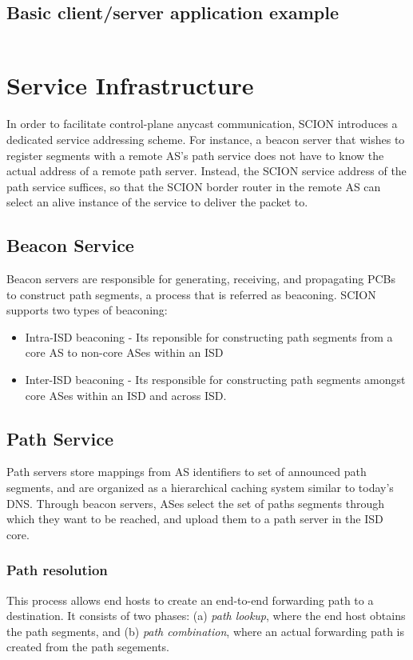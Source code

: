 \subsection{Basic client/server application example}
\inputminted[frame=lines, framesep=2mm, baselinestretch=1.2, fontsize=\footnotesize, linenos]{go}{code_snippets/temp.go}

\section{Service Infrastructure}
In order to facilitate control-plane anycast communication, SCION introduces a dedicated service addressing scheme. For instance, a beacon server that wishes to register segments with a remote AS's path service does not have to know the actual address of a remote path server. Instead, the SCION service address of the path service suffices, so that the SCION border router in the remote AS can select an alive instance of the service to deliver the packet to.

\subsection{Beacon Service}
Beacon servers are responsible for generating, receiving, and propagating PCBs to construct path segments, a process that is referred as beaconing. SCION supports two types of beaconing:
\begin{itemize}
    \item Intra-ISD beaconing - Its reponsible for constructing path segments from a core AS to non-core ASes within an ISD
    \item Inter-ISD beaconing - Its responsible for constructing path segments amongst core ASes within an ISD and across ISD.
\end{itemize}

\subsection{Path Service}
Path servers store mappings from AS identifiers to set of announced path segments, and are organized as a hierarchical caching system similar to today's DNS. Through beacon servers, ASes select the set of paths segments through which they want to be reached, and upload them to a path server in the ISD core.

\subsubsection{Path resolution}
This process allows end hosts to create an end-to-end forwarding path to a destination. It consists of two phases: (a) \textit{path lookup}, where the end host obtains the path segments, and (b) \textit{path combination}, where an actual forwarding path is created from the path segements.

